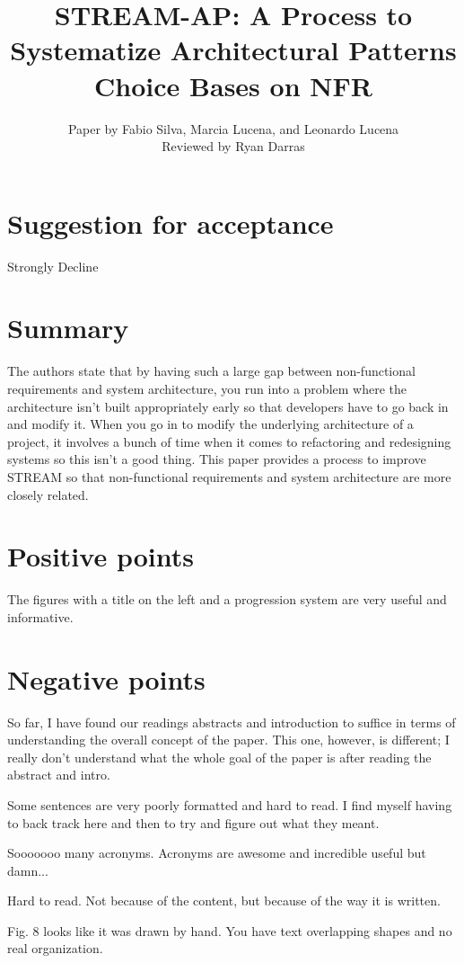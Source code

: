 \documentclass[11pt,twoside]{IEEEtran}
\title{STREAM-AP: A Process to Systematize Architectural Patterns Choice Bases on NFR}
\author{Paper by Fabio Silva, Marcia Lucena, and Leonardo Lucena\\Reviewed by Ryan Darras}
\begin{document}
\maketitle

\section{Suggestion for acceptance}
Strongly Decline

\section{Summary}
The authors state that by having such a large gap between non-functional requirements and system architecture, you run into a problem where the architecture isn't built appropriately early so that developers have to go back in and modify it. When you go in to modify the underlying architecture of a project, it involves a bunch of time when it comes to refactoring and redesigning systems so this isn't a good thing. This paper provides a process to improve STREAM so that non-functional requirements and system architecture are more closely related. 


\section{Positive points}
The figures with a title on the left and a progression system are very useful and informative.


\section{Negative points}
So far, I have found our readings abstracts and introduction to suffice in terms of understanding the overall concept of the paper. This one, however, is different; I really don't understand what the whole goal of the paper is after reading the abstract and intro.

Some sentences are very poorly formatted and hard to read. I find myself having to back track here and then to try and figure out what they meant.

Sooooooo many acronyms. Acronyms are awesome and incredible useful but damn...

Hard to read. Not because of the content, but because of the way it is written.

Fig. 8 looks like it was drawn by hand. You have text overlapping shapes and no real organization.
\end{document}

